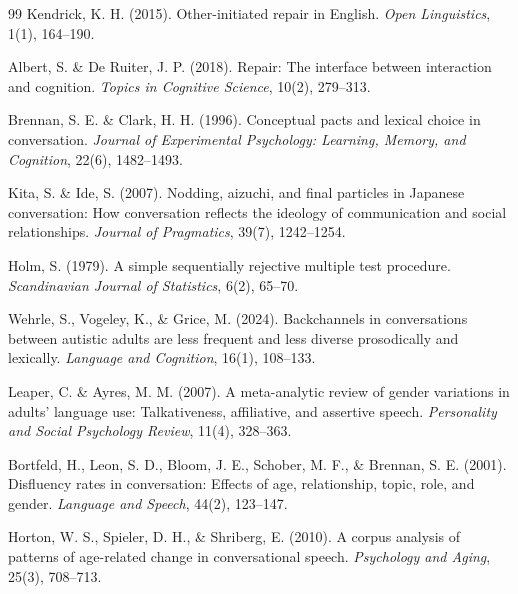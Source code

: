 \documentclass[dvipdfmx,11pt,a4paper]{bxjsarticle}
\renewcommand{\_}{\paperorigunderscore\allowbreak}%
\begin{document}
\begin{thebibliography}{99}
Kendrick, K. H. (2015).
Other-initiated repair in English.
\textit{Open Linguistics}, 1(1), 164--190.

Albert, S. \& De Ruiter, J. P. (2018).
Repair: The interface between interaction and cognition.
\textit{Topics in Cognitive Science}, 10(2), 279--313.

Brennan, S. E. \& Clark, H. H. (1996).
Conceptual pacts and lexical choice in conversation.
\textit{Journal of Experimental Psychology: Learning, Memory, and Cognition}, 22(6), 1482--1493.

Kita, S. \& Ide, S. (2007).
Nodding, aizuchi, and final particles in Japanese conversation: How conversation reflects the ideology of communication and social relationships.
\textit{Journal of Pragmatics}, 39(7), 1242--1254.

Holm, S. (1979).
A simple sequentially rejective multiple test procedure.
\textit{Scandinavian Journal of Statistics}, 6(2), 65--70.

Wehrle, S., Vogeley, K., \& Grice, M. (2024).
Backchannels in conversations between autistic adults are less frequent and less diverse prosodically and lexically.
\textit{Language and Cognition}, 16(1), 108--133.

Leaper, C. \& Ayres, M. M. (2007).
A meta-analytic review of gender variations in adults' language use: Talkativeness, affiliative, and assertive speech.
\textit{Personality and Social Psychology Review}, 11(4), 328--363.

Bortfeld, H., Leon, S. D., Bloom, J. E., Schober, M. F., \& Brennan, S. E. (2001).
Disfluency rates in conversation: Effects of age, relationship, topic, role, and gender.
\textit{Language and Speech}, 44(2), 123--147.

Horton, W. S., Spieler, D. H., \& Shriberg, E. (2010).
A corpus analysis of patterns of age-related change in conversational speech.
\textit{Psychology and Aging}, 25(3), 708--713.

\end{thebibliography}
\end{document}
